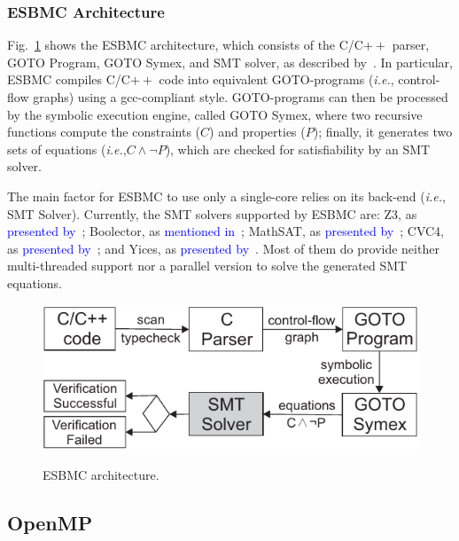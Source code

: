 \documentclass{doublecol-new}
\theoremstyle{TH}{
\newtheorem{lemma}{Lemma}
\newtheorem{theorem}[lemma]{Theorem}
\newtheorem{corrolary}[lemma]{Corrolary}
\newtheorem{conjecture}[lemma]{Conjecture}
\newtheorem{proposition}[lemma]{Proposition}
\newtheorem{claim}[lemma]{Claim}
\newtheorem{stheorem}[lemma]{Wrong Theorem}
\newtheorem{algorithm}{Algorithm}
}
\theoremstyle{THrm}{
\newtheorem{definition}{Definition}[section]
\newtheorem{question}{Question}[section]
\newtheorem{remark}{Remark}
\newtheorem{scheme}{Scheme}
}
\theoremstyle{THhit}{
\newtheorem{case}{Case}[section]
}
\begin{document}
\subsubsection{ESBMC Architecture}
\label{ESBMCArchitecture}

Fig.~\ref{ESBMC-Architecture} shows the ESBMC architecture, which consists of the C/C$++$ parser, GOTO Program, GOTO Symex, and SMT solver, as described by~\cite{Cordeiro2012}. In particular, ESBMC compiles C/C$++$ code into equivalent GOTO-programs ({\it i.e.}, control-flow graphs) using a gcc-compliant style. GOTO-programs can then be processed by the symbolic execution engine, called GOTO Symex, where two recursive functions compute the constraints ($C$) and properties ($P$); finally, it generates two sets of equations ({\it i.e.},\:$C \land \neg P$), which are checked for satisfiability by an SMT solver. 

The main factor for ESBMC to use only a single-core relies on its back-end ({\it i.e.}, SMT Solver). Currently, the SMT solvers supported by ESBMC are: Z3, as \textcolor{blue}{presented by}~\cite{DeMoura2008}; Boolector, as \textcolor{blue}{mentioned in}~\cite{Brummayer2009}; MathSAT, as \textcolor{blue}{presented by}~\cite{Barrett2011}; CVC4, as \textcolor{blue}{presented by}~\cite{Bozzano2005}; and Yices, as \textcolor{blue}{presented by}~\cite{Dutertre2014}. Most of them do provide neither multi-threaded support nor a parallel version to solve the generated SMT equations.

\begin{figure}[ht]
	\caption{ESBMC architecture.}
	\centering
	\includegraphics[scale=0.9]{figures/esbmc-arch-new.pdf} 
	\label{ESBMC-Architecture}
\end{figure}

\subsection{OpenMP}
\label{OpenMP}
\end{document}
